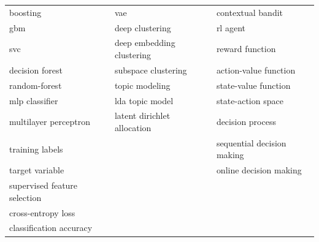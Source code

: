 \begin{xltabular}{\textwidth}{XXX}
boosting & vae & contextual bandit \\
gbm & deep clustering & rl agent \\
svc & deep embedding clustering & reward function \\
decision forest & subspace clustering & action-value function \\
random-forest & topic modeling & state-value function \\
mlp classifier & lda topic model & state-action space \\
multilayer perceptron & latent dirichlet allocation & decision process \\
training labels & & sequential decision making \\
target variable & & online decision making \\
supervised feature selection & & \\
cross-entropy loss & & \\
classification accuracy & & \\
\bottomrule
\end{xltabular}